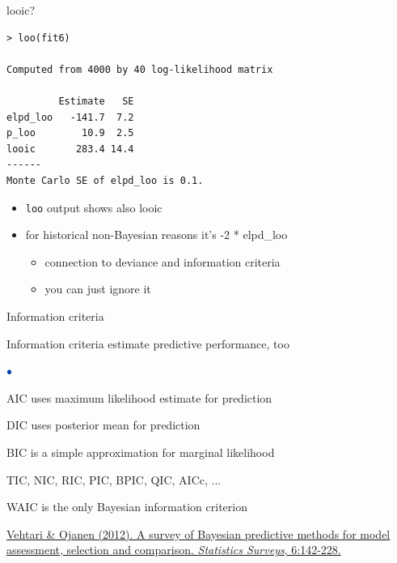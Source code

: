 \documentclass[english,t]{beamer}
\newenvironment{list1}{
   \begin{list}{$\color{list1}\bullet$}{\itemsep=6pt}}{
  \end{list}}
\begin{document}
\begin{frame}[fragile]{looic?}

{\scriptsize
\begin{lstlisting}
> loo(fit6)

Computed from 4000 by 40 log-likelihood matrix

         Estimate   SE
elpd_loo   -141.7  7.2
p_loo        10.9  2.5
looic       283.4 14.4
------
Monte Carlo SE of elpd_loo is 0.1.
\end{lstlisting}}

  \begin{itemize}
  \item \texttt{loo} output shows also {looic}
  \item for historical non-Bayesian reasons it's -2 * elpd\_loo
    \begin{itemize}
      \item connection to deviance and information criteria
      \item you can just ignore it
    \end{itemize}

  \end{itemize}
  
\end{frame}

\begin{frame}{Information criteria}

  Information criteria estimate predictive performance, too
  
\begin{list1}
  \item<+-> AIC uses maximum likelihood estimate for prediction
  \item<+-> DIC uses posterior mean for prediction
  \item<+-> BIC is a simple approximation for marginal likelihood
  \item<+-> TIC, NIC, RIC, PIC, BPIC, QIC, AICc, ...
  \item<+-> WAIC is the only Bayesian information criterion
\end{list1}

\vspace{5\baselineskip}
{\color{gray}\footnotesize\href{http://dx.doi.org/10.1214/12-SS102}{Vehtari \& Ojanen (2012). A survey of Bayesian predictive methods for model assessment, selection and comparison. \textit{Statistics Surveys}, 6:142-228.}}
\end{frame}
\end{document}
